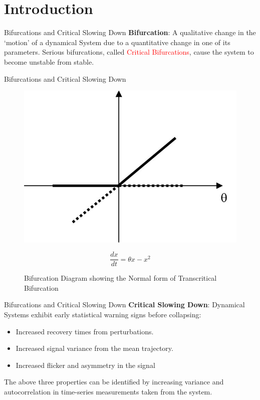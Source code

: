 \section[Introduction]{Introduction}
\label{sec:introduction}

\begin{frame}{Bifurcations and Critical Slowing Down}
	\textbf{Bifurcation}: A qualitative change in the `motion' of a dynamical System due to a quantitative change in one of its parameters. Serious bifurcations, called \textcolor{red}{Critical Bifurcations}, cause the system to become unstable from stable.
\end{frame}

\begin{frame}{Bifurcations and Critical Slowing Down}
	\begin{figure}
		\centering
		\includegraphics[scale=1.00]{../figures/transcriticalBifurcation}
		\label{fig:transcritBifurcation}
		\caption{Bifurcation Diagram showing the Normal form of Transcritical Bifurcation}
		\begin{equation}
		\frac{dx}{dt} = \theta x - x^2
		\end{equation}
	\end{figure}
\end{frame}

\begin{frame}{Bifurcations and Critical Slowing Down}
	\textbf{Critical Slowing Down}: Dynamical Systems exhibit early statistical warning signs before collapsing:
	
	\begin{itemize}
		\item Increased recovery times from perturbations.
		\item Increased signal variance from the mean trajectory.
		\item Increased flicker and asymmetry in the signal
	\end{itemize}

The above three properties can be identified by increasing variance and autocorrelation in time-series measurements taken from the system.
\end{frame}
